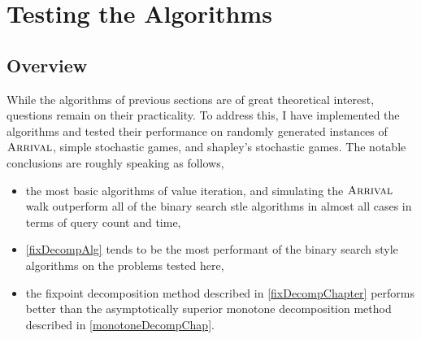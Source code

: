 \chapter{Testing the Algorithms} \label{testingChap}
\newcommand{\code}[1]{\lstinline|#1|}
\section{Overview}
While the algorithms of previous sections are of great theoretical interest,
questions remain on their practicality. To address this,
I have implemented the algorithms and tested their performance on
randomly generated instances of $ \textsc{Arrival} $, simple stochastic games, and
shapley's stochastic games. The notable conclusions are roughly speaking as follows,
\begin{itemize}
  \item the most basic algorithms of value iteration, and simulating the $\textsc{Arrival}$ walk outperform all of the
binary search stle algorithms in almost all cases in terms of query count and time,
\item \cref{fixDecompAlg} tends to be the most performant of the binary search style algorithms on the problems tested
  here,
  \item the fixpoint decomposition method described in \cref{fixDecompChapter} performs better than the asymptotically superior
monotone decomposition method described in \cref{monotoneDecompChap}.
\end{itemize}




